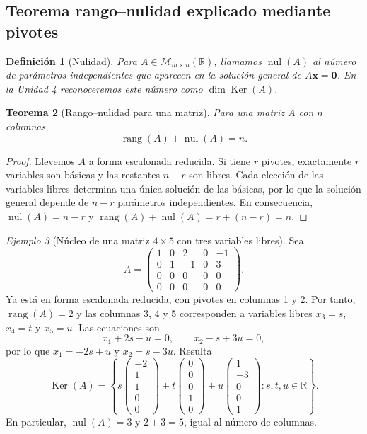 \documentclass[12pt]{article}
\newtheorem{definicion}{Definición}[section]
\newtheorem{teorema}[definicion]{Teorema}
\theoremstyle{remark}
\newtheorem{ejemplo}[definicion]{Ejemplo}
\newcommand{\R}{\mathbb{R}}
\newcommand{\Mat}[2]{\mathcal{M}_{#1\times #2}}
\newcommand{\rang}{\operatorname{rang}}
\newcommand{\Ker}{\operatorname{Ker}}
\newcommand{\vect}[1]{\boldsymbol{#1}}
\begin{document}
\subsection{Teorema rango--nulidad explicado mediante pivotes}
\begin{definicion}[Nulidad]
Para $A\in\Mat{m}{n}(\R)$, llamamos $\operatorname{nul}(A)$ al número de parámetros independientes que aparecen en la solución general de $A\vect x=\vect0$. En la Unidad 4 reconoceremos este número como $\dim\Ker(A)$.
\end{definicion}
\begin{teorema}[Rango--nulidad para una matriz]
Para una matriz $A$ con $n$ columnas,
\[
\boxed{\rang(A)+\operatorname{nul}(A)=n.}
\]
\end{teorema}
\begin{proof}
Llevemos $A$ a forma escalonada reducida. Si tiene $r$ pivotes, exactamente $r$ variables son básicas y las restantes $n-r$ son libres. Cada elección de las variables libres determina una única solución de las básicas, por lo que la solución general depende de $n-r$ parámetros independientes. En consecuencia, $\operatorname{nul}(A)=n-r$ y $\rang(A)+\operatorname{nul}(A)=r+(n-r)=n$.
\end{proof}
\begin{ejemplo}[Núcleo de una matriz $4\times5$ con tres variables libres]
Sea
\[
A=\begin{pmatrix}
1&0&2&0&-1\\0&1&-1&0&3\\0&0&0&0&0\\0&0&0&0&0
\end{pmatrix}.
\]
Ya está en forma escalonada reducida, con pivotes en columnas 1 y 2. Por tanto, $\rang(A)=2$ y las columnas 3, 4 y 5 corresponden a variables libres $x_3=s$, $x_4=t$ y $x_5=u$. Las ecuaciones son
\[
x_1+2s-u=0,\qquad x_2-s+3u=0,
\]
por lo que $x_1=-2s+u$ y $x_2=s-3u$. Resulta
\[
\Ker(A)=\left\{s\begin{pmatrix}-2\\1\\1\\0\\0\end{pmatrix}
+t\begin{pmatrix}0\\0\\0\\1\\0\end{pmatrix}
+u\begin{pmatrix}1\\-3\\0\\0\\1\end{pmatrix}:s,t,u\in\R\right\}.
\]
En particular, $\operatorname{nul}(A)=3$ y $2+3=5$, igual al número de columnas.
\end{ejemplo}
\end{document}
